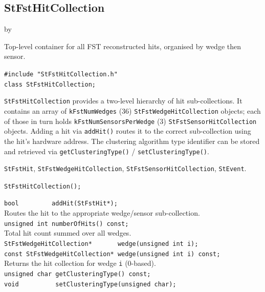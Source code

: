\documentclass[twoside]{article}
\newcommand{\entrylabel}[1]{\mbox{\textbf{{#1}}}\hfil}%
\newenvironment{entry}
{\begin{list}{}%
    {\renewcommand{\makelabel}{\entrylabel}%
     \setlength{\labelwidth}{90pt}%
     \setlength{\leftmargin}{\labelwidth}
     \advance\leftmargin by \labelsep%
      }%
    }%
  {\end{list}}
\newcommand{\Entrylabel}[1]%
{\raisebox{0pt}[1ex][0pt]{\makebox[\labelwidth][l]%
    {\parbox[t]{\labelwidth}{\hspace{0pt}\textbf{{#1}}}}}}
\newenvironment{Entry}%
{\renewcommand{\entrylabel}{\Entrylabel}\begin{entry}}%
  {\end{entry}}
\begin{document}
\subsection{StFstHitCollection}
\label{sec:StFstHitCollection}
\begin{Entry}
\item[Summary] Top-level container for all FST reconstructed hits, organised by wedge
  then sensor.
\item[Synopsis]
    \verb+#include "StFstHitCollection.h"+\\
    \verb+class StFstHitCollection;+\\
\item[Description]
  \texttt{StFstHitCollection} provides a two-level hierarchy of hit sub-collections.  It
  contains an array of \texttt{kFstNumWedges} (36) \texttt{StFstWedgeHitCollection}
  objects; each of those in turn holds \texttt{kFstNumSensorsPerWedge} (3)
  \texttt{StFstSensorHitCollection} objects.  Adding a hit via \texttt{addHit()} routes
  it to the correct sub-collection using the hit's hardware address.  The clustering
  algorithm type identifier can be stored and retrieved via
  \texttt{getClusteringType()} / \texttt{setClusteringType()}.
\item[Related Classes]
  \texttt{StFstHit}, \texttt{StFstWedgeHitCollection},
  \texttt{StFstSensorHitCollection}, \texttt{StEvent}.
\item[Public\\ Constructors]
    \verb+StFstHitCollection();+\\
\item[Public Member\\ Functions]
    \verb+bool         addHit(StFstHit*);+\\
    Routes the hit to the appropriate wedge/sensor sub-collection.\\[2pt]
    \verb+unsigned int numberOfHits() const;+\\
    Total hit count summed over all wedges.\\[2pt]
    \verb+StFstWedgeHitCollection*       wedge(unsigned int i);+\\
    \verb+const StFstWedgeHitCollection* wedge(unsigned int i) const;+\\
    Returns the hit collection for wedge \texttt{i} (0-based).\\[2pt]
    \verb+unsigned char getClusteringType() const;+\\
    \verb+void          setClusteringType(unsigned char);+\\
\end{Entry}
\clearpage
\end{document}
